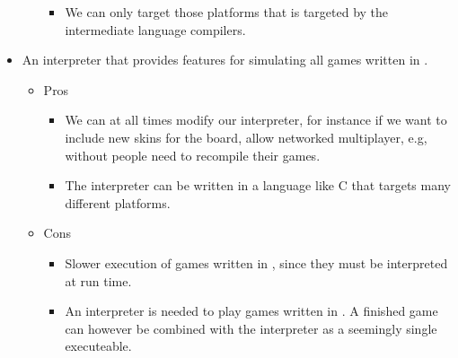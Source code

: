 \begin{itemize}[noitemsep]
\begin{itemize}[noitemsep]
\begin{itemize}[noitemsep]
		\item We can only target those platforms that is targeted by the intermediate language compilers.
		\end{itemize}
	\end{itemize}
\item An interpreter that provides features for simulating all games written in \productname{}.
	\begin{itemize}[noitemsep]
	\item Pros
		\begin{itemize}[noitemsep]
		\item We can at all times modify our interpreter, for instance if we want to include new skins for the board, allow networked multiplayer, e.g, without people need to recompile their games. 
		\item The interpreter can be written in a language like C that targets many different platforms.
		\end{itemize}
	\item Cons
		\begin{itemize}[noitemsep]
		\item Slower execution of games written in \productname{}, since they must be interpreted at run time.
		\item An interpreter is needed to play games written in \productname{}. A finished game can however be combined with the interpreter as a seemingly single executeable.
		\end{itemize}
	\end{itemize}
\end{itemize}